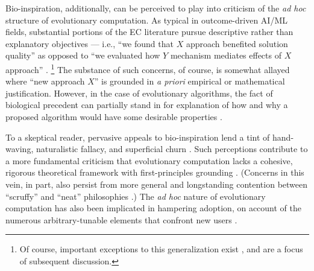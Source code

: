 Bio-inspiration, additionally, can be perceived to play into criticism of the \textit{ad hoc} structure of evolutionary computation.
As typical in outcome-driven AI/ML fields, substantial portions of the EC literature pursue descriptive rather than explanatory objectives --- i.e., ``we found that $X$ approach benefited solution quality'' as opposed to ``we evaluated how $Y$ mechanism mediates effects of $X$ approach'' \citep{lipton2019troubling,hutson2018ai,sculley2018winner,del2019bio}.%
\footnote{%
  Of course, important exceptions to this generalization exist \citep{TODO}, and are a focus of subsequent discussion.
}
The substance of such concerns, of course, is somewhat allayed where ``new approach $X$'' is grounded in \textit{a priori} empirical or mathematical justification.
However, in the case of evolutionary algorithms, the fact of biological precedent can partially stand in for explanation of how and why a proposed algorithm would have some desirable properties \citep{sorenson2015metaheuristics}.

To a skeptical reader, pervasive appeals to bio-inspiration lend a tint of hand-waving, naturalistic fallacy, and superficial churn \citep{wortmann2020does,sorensen2015metaheuristics}.
Such perceptions contribute to a more fundamental criticism that evolutionary computation lacks a cohesive, rigorous theoretical framework with first-principles grounding \citep{TODO}.
(Concerns in this vein, in part, also persist from more general and longstanding contention between ``scruffy'' and ``neat'' philosophies \citep[p. 16]{jones2008artificial} \citep{minsky1991logical}.)
The \textit{ad hoc} nature of evolutionary computation has also been implicated in hampering adoption, on account of the numerous arbitrary-tunable elements that confront new users \citep{oneil2010open}.

